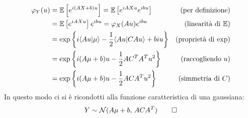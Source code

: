 \begin{dimo}
\Fixvmode
  \begin{align*}
  \varphi_Y(u) &  = \mathbb E\left[e^{i(AX+b)u}\right] = \mathbb E \left[e^{iAXu}e^{ibu} \right] & (\text{per definizione}) \\
  &= \mathbb E\left[e^{iAXu}\right]e^{ibu} = \varphi_X(Au)e^{ibu} & (\text{linearità di } \mathbb E)\\
  &= \exp \left\{i \langle Au |  \mu \rangle  - \frac{1}{2} \langle Au | CAu \rangle  + biu \right\} & (\text{proprietà di exp})\\
  &= \exp \left\{i(A\mu + b)u - \frac{1}{2}AC^TA^Tu^2\right\} & (\text{raccogliendo }u) \\
  &= \exp \left\{i(A \mu + b)u -\frac{1}{2}ACA^Tu^2\right\} & (\text{simmetria di } C)
  \end{align*}
  In questo modo ci si è ricondotti alla funzione caratteristica di una gaussiana:
  $$Y \sim \mathcal N(A\mu+b,\, ACA^T) \qedhere$$
\end{dimo}

